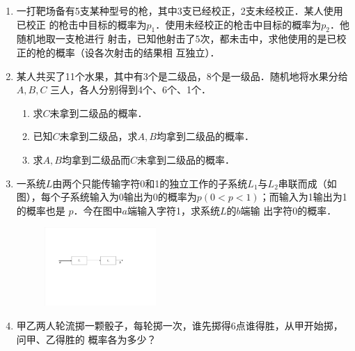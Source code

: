 \documentclass[10pt,a4paper]{article}
\begin{document}
\begin{enumerate}






    \item 一打靶场备有5支某种型号的枪，其中3支已经校正，2支未经校正．某人使用已校正
    的枪击中目标的概率为$p_1$．使用未经校正的枪击中目标的概率为$p_2$．他随机地取一支枪进行
    射击，已知他射击了5次，都未击中，求他使用的是已校正的枪的概率（设各次射击的结果相
    互独立）．



    \item 某人共买了11个水果，其中有3个是二级品，8个是一级品．随机地将水果分给$A,B,C$
    三人，各人分别得到4个、6个、1个．
    \begin{enumerate}
        \item 求$C$未拿到二级品的概率．
        \item 已知$C$未拿到二级品，求$A,B$均拿到二级品的概率．
        \item 求$A,B$均拿到二级品而$C$未拿到二级品的概率．
    \end{enumerate}



    \item 一系统$L$由两个只能传输字符0和1的独立工作的子系统$L_1$与$L_2$串联而成（如
    图），每个子系统输入为0输出为0的概率为$p(0<p<1)$；而输入为1输出为1的概率也是
    $p$．今在图中$a$端输入字符1，求系统$L$的$b$端输
    出字符0的概率．
    \begin{figure}[H]
        \flushright 
        \includegraphics[width=0.4\textwidth]{3.pdf}
    \end{figure}
    \vspace{-0.5cm}



    \item 甲乙两人轮流掷一颗骰子，每轮掷一次，谁先掷得6点谁得胜，从甲开始掷，问甲、乙得胜的
    概率各为多少？




\end{enumerate}
\end{document}
